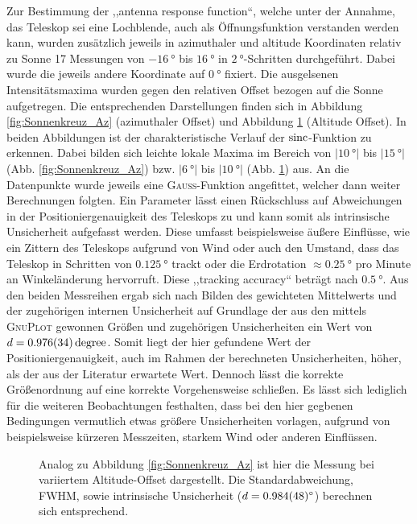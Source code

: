     Zur Bestimmung der ,,antenna response function``,
    welche unter der Annahme, das Teleskop sei eine Lochblende, auch als Öffnungsfunktion verstanden werden kann,
    wurden zusätzlich jeweils in azimuthaler und altitude Koordinaten relativ zu Sonne 17 Messungen von $\SI{-16}{\degree}$ bis $\SI{16}{\degree}$ in $\SI{2}{\degree}$-Schritten durchgeführt.
    Dabei wurde die jeweils andere Koordinate auf $\SI{0}{\degree}$ fixiert.
    Die ausgelsenen Intensitätsmaxima wurden gegen den relativen Offset bezogen auf die Sonne aufgetregen.
    Die entsprechenden Darstellungen finden sich in Abbildung \ref{fig:Sonnenkreuz_Az} (azimuthaler Offset) und Abbildung \ref{fig:Sonnenkreuz_Alt} (Altitude Offset).
    In beiden Abbildungen ist der charakteristische Verlauf der $\operatorname{sinc}$-Funktion zu erkennen.
    Dabei bilden sich leichte lokale Maxima im Bereich von $\vert\SI{10}{\degree}\vert$ bis $\vert\SI{15}{\degree}\vert$ (Abb. \ref{fig:Sonnenkreuz_Az}) bzw. $\vert\SI{6}{\degree}\vert$ bis $\vert\SI{10}{\degree}\vert$ (Abb. \ref{fig:Sonnenkreuz_Alt}) aus.
    An die Datenpunkte wurde jeweils eine \textsc{Gauß}-Funktion angefittet, welcher dann weiter Berechnungen folgten.
    Ein Parameter lässt einen Rückschluss auf Abweichungen in der Positioniergenauigkeit des Teleskops zu und kann somit als intrinsische Unsicherheit aufgefasst werden.
    Diese umfasst beispielsweise äußere Einflüsse, wie ein Zittern des Teleskops aufgrund von Wind oder auch den Umstand, dass das Teleskop in Schritten von $\SI{0.125}{\degree}$ trackt \cite{Usermanual} oder die Erdrotation $\approx \SI{0.25}{\degree}$ pro Minute an Winkeländerung hervorruft.
    Diese ,,tracking accuracy`` beträgt nach \cite{Usermanual} $\SI{0.5}{\degree}$. 
    Aus den beiden Messreihen ergab sich nach Bilden des gewichteten Mittelwerts und der zugehörigen internen Unsicherheit auf Grundlage der aus den mittels \textsc{GnuPlot} gewonnen Größen und zugehörigen Unsicherheiten ein Wert von $d = \SI{0.976 \pm 0.034}{degree}$.
    Somit liegt der hier gefundene Wert der Positioniergenauigkeit, auch im Rahmen der berechneten Unsicherheiten, höher, als der aus der Literatur erwartete Wert. 
    Dennoch lässt die korrekte Größenordnung auf eine korrekte Vorgehensweise schließen.
    Es lässt sich lediglich für die weiteren Beobachtungen festhalten, dass bei den hier gegbenen Bedingungen vermutlich etwas größere Unsicherheiten vorlagen, aufgrund von beispielsweise kürzeren Messzeiten, starkem Wind oder anderen Einflüssen.\\ 

    \begin{figure}[H]
        \centering
        
        \caption[Kreuz-Scan der Sonne, Altitude Offset]{Analog zu Abbildung \ref{fig:Sonnenkreuz_Az} ist hier die Messung bei variiertem Altitude-Offset dargestellt. Die Standardabweichung, FWHM, sowie intrinsische Unsicherheit ($d = \SI{0.984 \pm 0.048}{\degree}$) berechnen sich entsprechend.}
        \label{fig:Sonnenkreuz_Alt}
    \end{figure}

